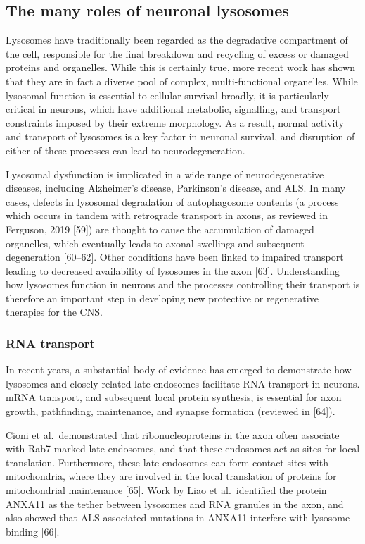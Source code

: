 \documentclass[
  12pt,
  a4paper,
]{book}
\begin{document}
\hypertarget{the-many-roles-of-neuronal-lysosomes}{%
\subsection{The many roles of neuronal lysosomes}\label{the-many-roles-of-neuronal-lysosomes}}

Lysosomes have traditionally been regarded as the degradative compartment of the cell, responsible for the final breakdown and recycling of excess or damaged proteins and organelles. While this is certainly true, more recent work has shown that they are in fact a diverse pool of complex, multi-functional organelles. While lysosomal function is essential to cellular survival broadly, it is particularly critical in neurons, which have additional metabolic, signalling, and transport constraints imposed by their extreme morphology. As a result, normal activity and transport of lysosomes is a key factor in neuronal survival, and disruption of either of these processes can lead to neurodegeneration.

Lysosomal dysfunction is implicated in a wide range of neurodegenerative diseases, including Alzheimer's disease, Parkinson's disease, and ALS. In many cases, defects in lysosomal degradation of autophagosome contents (a process which occurs in tandem with retrograde transport in axons, as reviewed in Ferguson, 2019 {[}59{]}) are thought to cause the accumulation of damaged organelles, which eventually leads to axonal swellings and subsequent degeneration {[}60--62{]}. Other conditions have been linked to impaired transport leading to decreased availability of lysosomes in the axon {[}63{]}. Understanding how lysosomes function in neurons and the processes controlling their transport is therefore an important step in developing new protective or regenerative therapies for the CNS.

\hypertarget{rna-transport}{%
\subsubsection{RNA transport}\label{rna-transport}}

In recent years, a substantial body of evidence has emerged to demonstrate how lysosomes and closely related late endosomes facilitate RNA transport in neurons. mRNA transport, and subsequent local protein synthesis, is essential for axon growth, pathfinding, maintenance, and synapse formation (reviewed in {[}64{]}).

Cioni et al.~demonstrated that ribonucleoproteins in the axon often associate with Rab7-marked late endosomes, and that these endosomes act as sites for local translation. Furthermore, these late endosomes can form contact sites with mitochondria, where they are involved in the local translation of proteins for mitochondrial maintenance {[}65{]}. Work by Liao et al.~identified the protein ANXA11 as the tether between lysosomes and RNA granules in the axon, and also showed that ALS-associated mutations in ANXA11 interfere with lysosome binding {[}66{]}.
\end{document}
